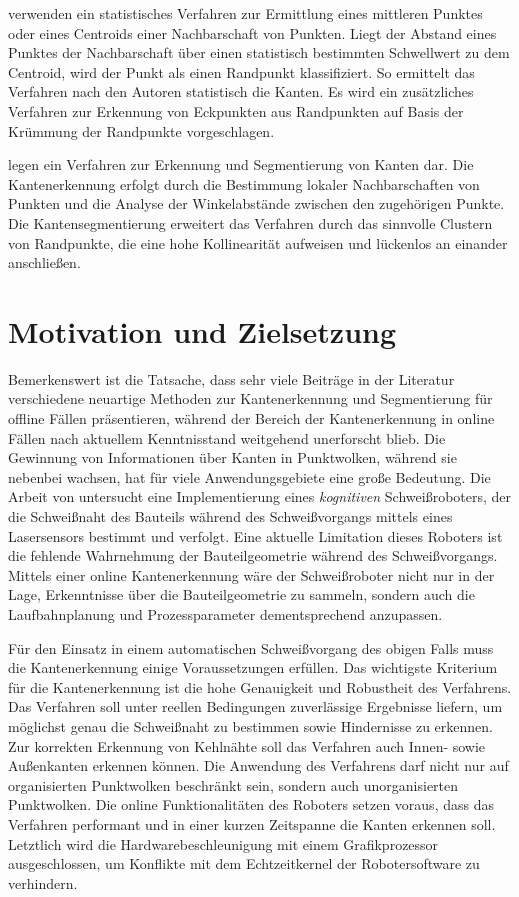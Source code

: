 \Textcite{ahmed_edge_2018} verwenden ein statistisches Verfahren zur Ermittlung eines mittleren Punktes oder eines Centroids einer Nachbarschaft von Punkten. Liegt der Abstand eines Punktes der Nachbarschaft über einen statistisch bestimmten Schwellwert zu dem Centroid, wird der Punkt als einen Randpunkt klassifiziert. So ermittelt das Verfahren nach den Autoren statistisch die Kanten. Es wird ein zusätzliches Verfahren zur Erkennung von Eckpunkten aus Randpunkten auf Basis der Krümmung der Randpunkte vorgeschlagen.

\Textcite{ni_edge_2016} legen ein Verfahren zur Erkennung und Segmentierung von Kanten dar. Die Kantenerkennung erfolgt durch die Bestimmung lokaler Nachbarschaften von Punkten und die Analyse der Winkelabstände zwischen den zugehörigen Punkte. Die Kantensegmentierung erweitert das Verfahren durch das sinnvolle Clustern von Randpunkte, die eine hohe Kollinearität aufweisen und lückenlos an einander anschließen. 

\section{Motivation und Zielsetzung} \label{Motivation}
Bemerkenswert ist die Tatsache, dass sehr viele Beiträge in der Literatur verschiedene neuartige Methoden zur Kantenerkennung und Segmentierung für offline Fällen präsentieren, während der Bereich der Kantenerkennung in online Fällen nach aktuellem Kenntnisstand weitgehend unerforscht blieb. Die Gewinnung von Informationen über Kanten in Punktwolken, während sie nebenbei wachsen, hat für viele Anwendungsgebiete eine große Bedeutung. Die Arbeit von \textcite{savla_intelligente_2022} untersucht eine Implementierung eines \textit{kognitiven} Schweißroboters, der die Schweißnaht des Bauteils während des Schweißvorgangs mittels eines Lasersensors bestimmt und verfolgt. Eine aktuelle Limitation dieses Roboters ist die fehlende Wahrnehmung der Bauteilgeometrie während des Schweißvorgangs. Mittels einer online Kantenerkennung wäre der Schweißroboter nicht nur in der Lage, Erkenntnisse über die Bauteilgeometrie zu sammeln, sondern auch die Laufbahnplanung und Prozessparameter dementsprechend anzupassen.

Für den Einsatz in einem automatischen Schweißvorgang des obigen Falls muss die Kantenerkennung einige Voraussetzungen erfüllen. Das wichtigste Kriterium für die Kantenerkennung ist die hohe Genauigkeit und Robustheit des Verfahrens. Das Verfahren soll unter reellen Bedingungen zuverlässige Ergebnisse liefern, um möglichst genau die Schweißnaht zu bestimmen sowie Hindernisse zu erkennen. Zur korrekten Erkennung von Kehlnähte soll das Verfahren auch Innen- sowie Außenkanten erkennen können. Die Anwendung des Verfahrens darf nicht nur auf organisierten Punktwolken beschränkt sein, sondern auch unorganisierten Punktwolken. Die online Funktionalitäten des Roboters setzen voraus, dass das Verfahren performant und in einer kurzen Zeitspanne die Kanten erkennen soll. Letztlich wird die Hardwarebeschleunigung mit einem Grafikprozessor ausgeschlossen, um Konflikte mit dem Echtzeitkernel der Robotersoftware zu verhindern. 

